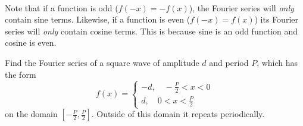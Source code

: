 \documentclass[../classical_mechanics.tex]{subfiles}
\begin{document}
        \paragraph{}
        Note that if a function is odd ($f(-x)=-f(x)$), the Fourier series will \textit{only} contain sine terms.
        Likewise, if a function is even ($f(-x)=f(x)$) its Fourier series will \textit{only} contain cosine terms.
        This is because sine is an odd function and cosine is even.
        \begin{example}
            Find the Fourier series of a square wave of amplitude $d$ and period $P$, which has the form
            \begin{equation}
                f(x)=\begin{cases}
                    -d,\quad-\frac{P}{2}<x<0\\
                    d,\quad 0<x<\frac{P}{2}
                \end{cases}
            \end{equation}
            on the domain $\left[-\frac{P}{2},\frac{P}{2}\right]$.
            Outside of this domain it repeats periodically.


\end{example}
\end{document}
